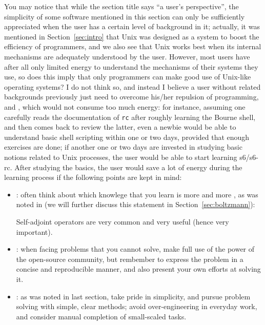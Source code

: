 You may notice that while the section title says ``a user's perspective'', the
simplicity of some software mentioned in this section can only be sufficiently
appreciated when the user has a certain level of background in it; actually,
it was mentioned in Section~\ref{sec:intro} that Unix was designed as a system
to boost the efficiency of programmers, and we also see that Unix works best
when its internal mechanisms are adequately understood by the user.  However,
most users have after all only limited energy to understand the mechanisms of
their systems they use, so does this imply that only programmers can make good
use of Unix-like operating systems?  I do not think so, and instead I believe
a user without related backgrounds previously just need to overcome his/her
repulsion of programming, and ,
which would not consume too much energy: for instance, assuming one carefully
reads the documentation of \verb|rc| after roughly learning the Bourne shell,
and then comes back to review the latter, even a newbie would be able to
understand basic shell scripting within one or two days, provided that enough
exercises are done; if another one or two days are invested in studying basic
notions related to Unix processes, the user would be able to start learning
s6/s6-rc.  After studying the basics, the user would save a lot of energy
during the learning process if the following points are kept in mind:
\begin{itemize}
\item {}:
	often think about which knowlege that you learn is more 
	and more , as was noted in \parencite{dodson1991} (we
	will further discuss this statement in Section~\ref{sec:boltzmann}):
\begin{quoting}
	Self-adjoint operators are very common
	and very useful (hence very important).
\end{quoting}
\item {}:
	when facing problems that you cannot solve, make full use of the power of
	the open-source community, but rembember to express the problem in a concise
	and reproducible manner, and also present your own efforts at solving it.
\item {}:
	as was noted in last section, take pride in simplicity, and pursue problem
	solving with simple, clear methods; avoid over-engineering in everyday
	work, and consider manual completion of small-scaled tasks.
\end{itemize}

